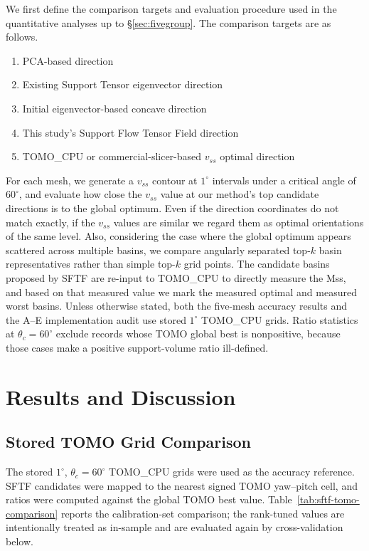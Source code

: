 \documentclass[11pt,a4paper]{article}
\begin{document}
We first define the comparison targets and evaluation procedure used in the quantitative analyses up to \S\ref{sec:fivegroup}.
The comparison targets are as follows.

\begin{enumerate}
\item PCA-based direction
\item Existing Support Tensor eigenvector direction
\item Initial eigenvector-based concave direction
\item This study's Support Flow Tensor Field direction
\item TOMO\_CPU or commercial-slicer-based $v_{ss}$ optimal direction
\end{enumerate}

For each mesh, we generate a $v_{ss}$ contour at $1^\circ$ intervals under a critical angle of $60^\circ$,
and evaluate how close the $v_{ss}$ value at our method's top candidate directions is to the global optimum.
Even if the direction coordinates do not match exactly, if the $v_{ss}$ values are similar we regard them as optimal orientations of the same level.
Also, considering the case where the global optimum appears scattered across multiple basins,
we compare angularly separated top-$k$ basin representatives rather than simple top-$k$ grid points.
The candidate basins proposed by SFTF are re-input to TOMO\_CPU to directly measure the Mss,
and based on that measured value we mark the measured optimal and measured worst basins.
Unless otherwise stated, both the five-mesh accuracy results and the A--E implementation audit use stored $1^\circ$ TOMO\_CPU grids. Ratio statistics at $\theta_c=60^\circ$ exclude records whose TOMO global best is nonpositive, because those cases make a positive support-volume ratio ill-defined.


\section{Results and Discussion}

\subsection{Stored TOMO Grid Comparison}

The stored $1^\circ$, $\theta_c=60^\circ$ TOMO\_CPU grids were used as the accuracy reference. SFTF candidates were mapped to the nearest signed TOMO yaw--pitch cell, and ratios were computed against the global TOMO best value. Table~\ref{tab:sftf-tomo-comparison} reports the calibration-set comparison; the rank-tuned values are intentionally treated as in-sample and are evaluated again by cross-validation below.
\end{document}

